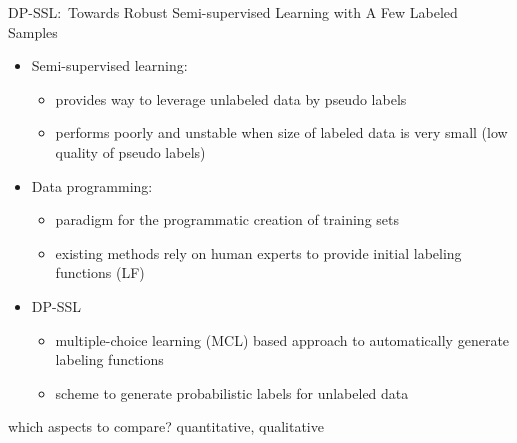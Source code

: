 DP-SSL:\ Towards Robust Semi-supervised Learning with A Few Labeled Samples~\cite{xu_dp-ssl_2021}
\begin{itemize}
    \item Semi-supervised learning:
        \begin{itemize}
            \item provides way to leverage unlabeled data by pseudo labels
            \item performs poorly and unstable when size of labeled data is very small (low quality
                of pseudo labels)
        \end{itemize}
    \item Data programming:
        \begin{itemize}
            \item paradigm for the programmatic creation of training sets
            \item existing methods rely on human experts to provide initial labeling functions (LF)
        \end{itemize}
    \item DP-SSL
        \begin{itemize}
            \item multiple-choice learning (MCL) based approach to automatically generate labeling functions
            \item scheme to generate probabilistic labels for unlabeled data
        \end{itemize}
\end{itemize}

which aspects to compare? quantitative, qualitative
